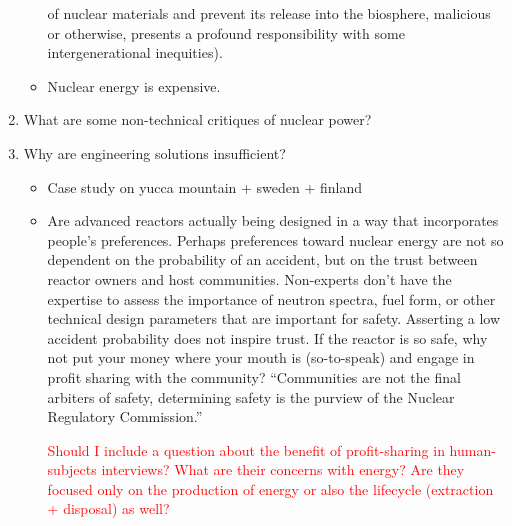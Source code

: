 \begin{enumerate}
\begin{itemize}
    of nuclear materials and prevent its release into the biosphere, malicious
    or otherwise, presents a profound responsibility with some intergenerational
    inequities).
    \item Nuclear energy is expensive.
\end{itemize}
\item What are some non-technical critiques of nuclear power?
\item Why are engineering solutions insufficient?
\begin{itemize}
    \item Case study on yucca mountain + sweden + finland
    \item Are advanced reactors actually being designed in a way that
    incorporates people's preferences. Perhaps preferences toward nuclear energy
    are not so dependent on the probability of an accident, but on the trust
    between reactor owners and host communities. Non-experts don't have the
    expertise to assess the importance of neutron spectra, fuel form, or other
    technical design parameters that are important for safety. Asserting a low
    accident probability does not inspire trust. If the reactor is so safe, why
    not put your money where your mouth is (so-to-speak) and engage in profit
    sharing with the community? ``Communities are not the final arbiters of
    safety, determining safety is the purview of the Nuclear Regulatory
    Commission.''


    \textcolor{red}{Should I include a question about the benefit of
    profit-sharing in human-subjects interviews? What are their concerns with
    energy? Are they focused only on the production of energy or also the
    lifecycle (extraction + disposal) as well?}
\end{itemize}
\end{enumerate}




